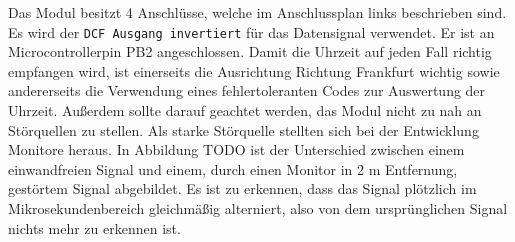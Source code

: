 \begin{figure}
  \vspace{-25pt}
  \begin{center}
  \end{center}
  \vspace{-20pt}
\end{figure}
%
Das Modul besitzt 4 Anschlüsse, welche im Anschlussplan links beschrieben sind. Es wird der \texttt{DCF Ausgang invertiert} für das Datensignal verwendet. Er ist an Microcontrollerpin PB2 angeschlossen. Damit die Uhrzeit auf jeden Fall richtig empfangen wird, ist einerseits die Ausrichtung Richtung Frankfurt wichtig sowie andererseits die Verwendung eines fehlertoleranten Codes zur Auswertung der Uhrzeit. Außerdem sollte darauf geachtet werden, das Modul nicht zu nah an Störquellen zu stellen. Als starke Störquelle stellten sich bei der Entwicklung Monitore heraus. In Abbildung TODO ist der Unterschied zwischen einem einwandfreien Signal und einem, durch einen Monitor in 2 m Entfernung, gestörtem Signal abgebildet. Es ist zu erkennen, dass das Signal plötzlich im Mikrosekundenbereich gleichmäßig alterniert, also von dem ursprünglichen Signal nichts mehr zu erkennen ist.

